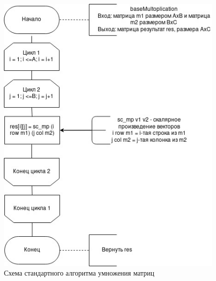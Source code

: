 \documentclass[12pt]{report}
\begin{document}
\begin{figure}[h]
	\centering
	\includegraphics[width=1\linewidth]{base.jpg}
	\caption{Схема стандартного алгоритма умножения матриц}
	\label{fig:mpr}
\end{figure}
\end{document}
